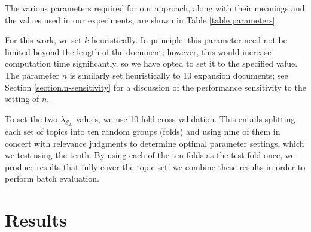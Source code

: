 \documentclass{article}
\begin{document}
The various parameters required for our approach, along with their meanings and the values used in our experiments, are shown in Table \ref{table.parameters}. 


For this work, we set $k$ heuristically. In principle, this parameter need not be limited beyond the length of the document; however, this would increase computation time significantly, so we have opted to set it to the specified value. The parameter $n$ is similarly set heuristically to 10 expansion documents; see Section \ref{section.n-sensitivity} for a discussion of the performance sensitivity to the setting of $n$.


To set the two $\lambda_{\mathcal{E}_D}$ values, we use 10-fold cross validation. This entails splitting each set of topics into ten random groups (folds) and using nine of them in concert with relevance judgments to determine optimal parameter settings, which we test using the tenth. By using each of the ten folds as the test fold once, we produce results that fully cover the topic set; we combine these results in order to perform batch evaluation. 

\section{Results}\label{section.results}
\end{document}
